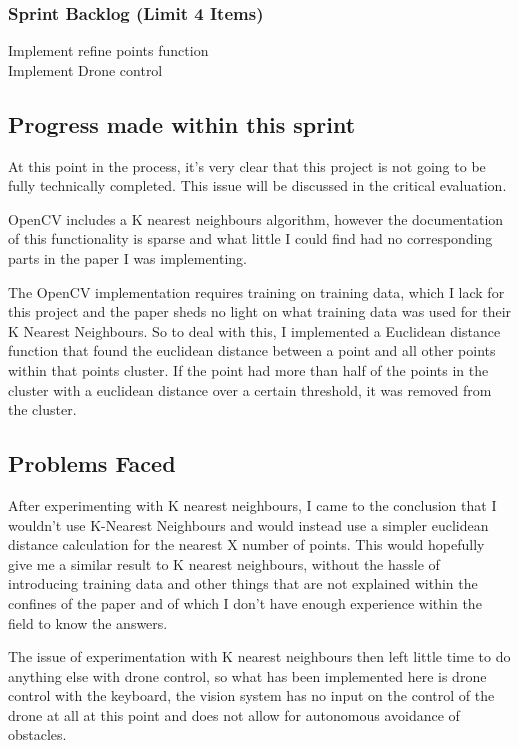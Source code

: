 \subsubsection{Sprint Backlog (Limit 4 Items)}

\begin{description}
  \item[Implement refine points function]
  \item[Implement Drone control]
\end{description}
\subsection{Progress made within this sprint}
At this point in the process, it's very clear that this project is not going to be fully technically completed. This issue will be discussed in the critical evaluation.

OpenCV includes a K nearest neighbours algorithm, however the documentation of this functionality is sparse and what little I could find had no corresponding parts in the paper I was implementing.

The OpenCV implementation requires training on training data, which I lack for this project and the paper sheds no light on what training data was used for their K Nearest Neighbours. So to deal with this, I implemented a Euclidean distance function that found the euclidean distance between a point and all other points within that points cluster. If the point had more than half of the points in the cluster with a euclidean distance over a certain threshold, it was removed from the cluster.
 
\subsection{Problems Faced}

After experimenting with K nearest neighbours, I came to the conclusion that I wouldn't use K-Nearest Neighbours and would instead use a simpler euclidean distance calculation for the nearest X number of points. This would hopefully give me a similar result to K nearest neighbours, without the hassle of introducing training data and other things that are not explained within the confines of the paper and of which I don't have enough experience within the field to know the answers.

The issue of experimentation with K nearest neighbours then left little time to do anything else with drone control, so what has been implemented here is drone control with the keyboard, the vision system has no input on the control of the drone at all at this point and does not allow for autonomous avoidance of obstacles.


